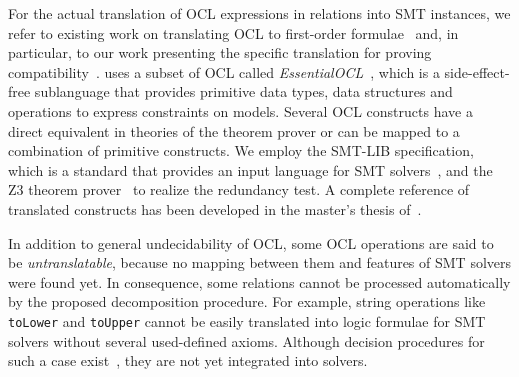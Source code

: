 
For the actual translation of \gls{OCL} expressions in \qvtr relations into \gls{SMT} instances, we refer to existing work on translating \gls{OCL} to first-order formulae~\cite{beckert2002ocltranslation} and, in particular, to our work presenting the specific translation for proving compatibility~.
\qvtr uses a subset of \gls{OCL} called \emph{EssentialOCL}~\cite{qvt}, which is a side-effect-free sublanguage that provides primitive data types, data structures and operations to express constraints on models.
Several \gls{OCL} constructs have a direct equivalent in theories of the theorem prover or can be mapped to a combination of primitive constructs.
We employ the SMT-LIB specification, which is a standard that provides an input language for \gls{SMT} solvers~\cite{smtlib2017}, and the Z3 theorem prover~\cite{z32008} to realize the redundancy test.
A complete reference of translated constructs has been developed in the master's thesis of~\textcite{pepin2019ma}.

In addition to general undecidability of \gls{OCL}, some \gls{OCL} operations are said to be \emph{untranslatable}, because no mapping between them and features of \gls{SMT} solvers were found yet.
In consequence, some \qvtr relations cannot be processed automatically by the proposed decomposition procedure.
For example, string operations like \texttt{toLower} and \texttt{toUpper} cannot be easily translated into logic formulae for \gls{SMT} solvers without several used-defined axioms.
Although decision procedures for such a case exist~\cite{veanes2012transducers}, they are not yet integrated into solvers.

